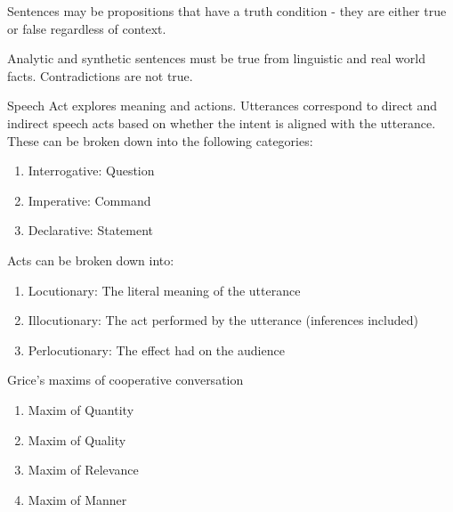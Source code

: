 \documentclass[12pt]{article}
\begin{document}
Sentences may be propositions that have a truth condition - they are either true or false regardless of context.

Analytic and synthetic sentences must be true from linguistic and real world facts. Contradictions are not true.

Speech Act explores meaning and actions. Utterances correspond to direct and indirect speech acts based on whether the intent is aligned with the utterance. These can be broken down into the following categories:
\begin{enumerate}
\item Interrogative: Question
\item Imperative: Command
\item Declarative: Statement
\end{enumerate}
Acts can be broken down into:
\begin{enumerate}
\item Locutionary: The literal meaning of the utterance
\item Illocutionary: The act performed by the utterance (inferences included)
\item Perlocutionary: The effect had on the audience
\end{enumerate}

Grice's maxims of cooperative conversation
\begin{enumerate}
\item Maxim of Quantity
\item Maxim of Quality
\item Maxim of Relevance
\item Maxim of Manner
\end{enumerate}
\end{document}
